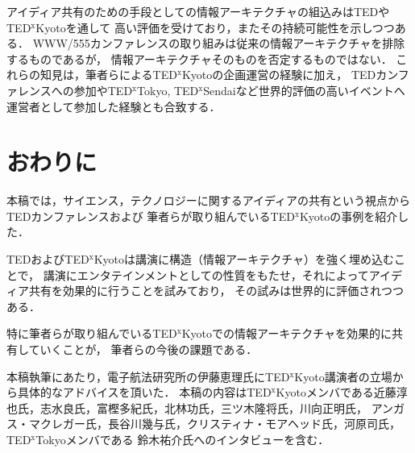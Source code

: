 \documentclass[submit,techreq,jkeyword,noauthor]{ipsj}
\newcommand{\TED}{\textrm{TED}}
\newcommand{\TEDx}{\TED${}^{\textrm{x}}$}
\newcommand{\TEDxTokyo}{\TEDx\textrm{Tokyo}}
\newcommand{\TEDxKyoto}{\TEDx\textrm{Kyoto}}
\newcommand{\TEDxSendai}{\TEDx\textrm{Sendai}}
\begin{document}
アイディア共有のための手段としての情報アーキテクチャの組込みは\TED や\TEDxKyoto を通して
高い評価を受けており，またその持続可能性を示しつつある．
WWW/555カンファレンスの取り組みは従来の情報アーキテクチャを排除するものであるが，
情報アーキテクチャそのものを否定するものではない．
これらの知見は，筆者らによる\TEDxKyoto の企画運営の経験に加え，
\TED カンファレンスへの参加や\TEDxTokyo, \TEDxSendai など世界的評価の高いイベントへ
運営者として参加した経験とも合致する．



\section{おわりに}

本稿では，サイエンス，テクノロジーに関するアイディアの共有という視点から\TED カンファレンスおよび
筆者らが取り組んでいる\TEDxKyoto の事例を紹介した．

\TED および\TEDxKyoto は講演に構造（情報アーキテクチャ）を強く埋め込むことで，
講演にエンタテインメントとしての性質をもたせ，それによってアイディア共有を効果的に行うことを試みており，
その試みは世界的に評価されつつある．

特に筆者らが取り組んでいる\TEDxKyoto での情報アーキテクチャを効果的に共有していくことが，
筆者らの今後の課題である．

\begin{acknowledgment}
本稿執筆にあたり，電子航法研究所の伊藤恵理氏に\TEDxKyoto 講演者の立場から具体的なアドバイスを頂いた．
本稿の内容は\TEDxKyoto メンバである近藤淳也氏，志水良氏，富樫多紀氏，北林功氏，三ツ木隆将氏，川向正明氏，
アンガス・マクレガー氏，長谷川幾与氏，クリスティナ・モアヘッド氏，河原司氏，\TEDxTokyo メンバである
鈴木祐介氏へのインタビューを含む．
\end{acknowledgment}
\end{document}
